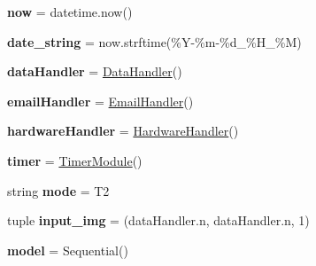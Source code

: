 \begin{DoxyCompactItemize}
\item 
\mbox{\label{namespaceTrainModels_a7b50d538df86ccd751bf581df2807d53}} 
{\bfseries now} = datetime.\+now()
\item 
\mbox{\label{namespaceTrainModels_a07b3abd382a830f18c2173044d8c2359}} 
{\bfseries date\+\_\+string} = now.\+strftime(\textquotesingle{}\%Y-\/\%m-\/\%d\+\_\+\%H\+\_\+\%M\textquotesingle{})
\item 
\mbox{\label{namespaceTrainModels_aee65351eea3aa49094cfd8b2830698a2}} 
{\bfseries data\+Handler} = \mbox{\hyperlink{classDataHandler_1_1DataHandler}{Data\+Handler}}()
\item 
\mbox{\label{namespaceTrainModels_a9a320c094658642e556dd99cda67c14b}} 
{\bfseries email\+Handler} = \mbox{\hyperlink{classEmailHandler_1_1EmailHandler}{Email\+Handler}}()
\item 
\mbox{\label{namespaceTrainModels_acda508ee651a24dc494b8b5d6b122a07}} 
{\bfseries hardware\+Handler} = \mbox{\hyperlink{classHardwareHandler_1_1HardwareHandler}{Hardware\+Handler}}()
\item 
\mbox{\label{namespaceTrainModels_a402cebc5f650b03cb0a34571814b0531}} 
{\bfseries timer} = \mbox{\hyperlink{classTimerModule_1_1TimerModule}{Timer\+Module}}()
\item 
\mbox{\label{namespaceTrainModels_a6ccdd5254438b40f6d215b41378b1a26}} 
string {\bfseries mode} = \textquotesingle{}T2\textquotesingle{}
\item 
\mbox{\label{namespaceTrainModels_a89fd756f1c13c4f91aff4c2d7228c921}} 
tuple {\bfseries input\+\_\+img} = (data\+Handler.\+n, data\+Handler.\+n, 1)
\item 
\mbox{\label{namespaceTrainModels_a1b636609ffc1e292387e3e1342035aaa}} 
{\bfseries model} = Sequential()
\item 
\mbox{\label{namespaceTrainModels_a1502ab8e1ca8878dcab1e8d146ba6b44}} 

\end{DoxyCompactItemize}
